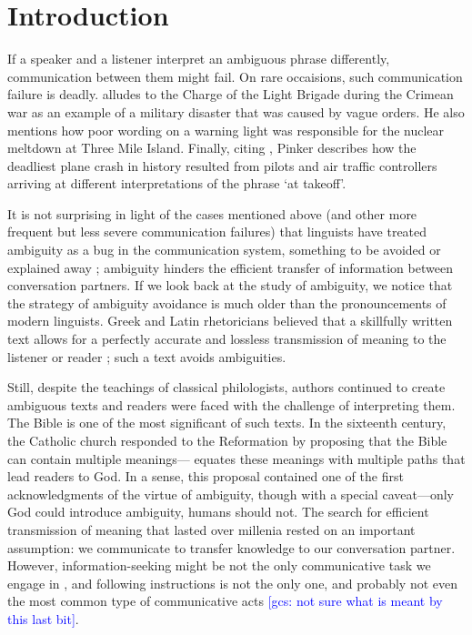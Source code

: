 \documentclass[10pt,a4paper]{article}
\newcommand{\gcs}[1]{\textcolor{blue}{[gcs: #1]}}
\begin{document}
\section{Introduction}

If a speaker and a listener interpret an ambiguous phrase differently, communication between them might fail. On rare occaisions, such communication failure is deadly.  alludes to the Charge of the Light Brigade during the Crimean war as an example of a military disaster that was caused by vague orders. He also mentions how poor wording on a warning light was responsible for the nuclear meltdown at Three Mile Island. Finally, citing , Pinker describes how the deadliest plane crash in history resulted from pilots and air traffic controllers arriving at different interpretations of the phrase `at takeoff'.

It is not surprising in light of the cases mentioned above (and other more frequent but less severe communication failures) that linguists have treated ambiguity as a bug in the communication system, something to be avoided or explained away  \cite{grice1975,chomsky2002minimalism}; ambiguity hinders the efficient transfer of information between conversation partners.
If we look back at the study of ambiguity, we notice that the strategy of ambiguity avoidance is much older than the pronouncements of modern linguists. 
Greek and Latin rhetoricians believed that a skillfully written text allows for a perfectly accurate and lossless transmission of meaning to the listener or reader \cite{ossarichardson2019}; such a text avoids ambiguities.

Still, despite the teachings of classical philologists, authors continued to  create ambiguous texts and readers were faced with the challenge of interpreting them. The Bible is one of the most significant of such texts. In the sixteenth century, the Catholic church responded to the Reformation by proposing that the Bible can contain multiple meanings--- equates these meanings with multiple paths that lead readers to God. In a sense, this proposal contained one of the first acknowledgments of the virtue of ambiguity, though with a  special caveat---only God could introduce ambiguity, humans should not. The search for efficient transmission of meaning that lasted over millenia rested on an important assumption: we communicate to transfer knowledge to our conversation partner. However, information-seeking might be not the only communicative task we engage in \cite{markova1995preface}, and following instructions is not the only one, and probably not even the most common type of communicative acts \cite{foppa1995mutual} \gcs{not sure what is meant by this last bit}. 
\end{document}
